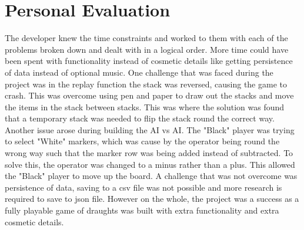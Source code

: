 \documentclass[10pt, a4paper]{article}
\begin{document}
	\section{Personal Evaluation}
The developer knew the time constraints and worked to them with each of the problems broken down and dealt with in a logical order. More time could have been spent with functionality instead of cosmetic details like getting persistence of data instead of optional music. One challenge that was faced during the project was in the replay function the stack was reversed, causing the game to crash. This was overcome using pen and paper to draw out the stacks and move the items in the stack between stacks. This was where the solution was found that a temporary stack was needed to flip the stack round the correct way. Another issue arose during building the AI vs AI. The "Black" player was trying to select "White" markers, which was cause by the operator being round the wrong way such that the marker row was being added instead of subtracted. To solve this, the operator was changed to a minus rather than a plus. This allowed the "Black" player to move up the board. A challenge that was not overcome was persistence of data, saving to a csv file was not possible and more research is required to save to json file. However on the whole, the project was a success as a fully playable game of draughts was built with extra functionality and extra cosmetic details.
    
   
   


		
\end{document}
